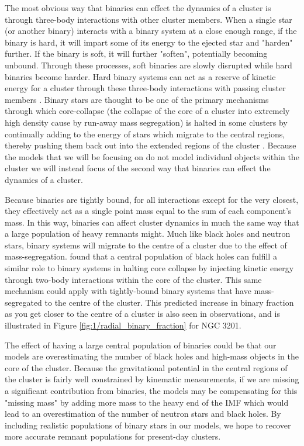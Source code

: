 The most obvious way that binaries can effect the dynamics of a cluster is through three-body
interactions with other cluster members. When a single star (or another binary) interacts with a
binary system at a close enough range, if the binary is hard, it will impart some of its energy to
the ejected star and "harden" further. If the binary is soft, it will further "soften", potentially
becoming unbound. Through these processes, soft binaries are slowly disrupted while hard binaries
become harder. Hard binary systems can act as a reserve of kinetic energy for a cluster through
these three-body interactions with passing cluster members \citep{Heggie2003}. Binary stars are
thought to be one of the primary mechanisms through which core-collapse (the collapse of the core of
a cluster into extremely high density cause by run-away mass segregation) is halted in some clusters
by continually adding to the energy of stars which migrate to the central regions, thereby pushing
them back out into the extended regions of the cluster \citep{Chatterjee2013}. Because the models
that we will be focusing on do not model individual objects within the cluster we will instead focus
of the second way that binaries can effect the dynamics of a cluster.

Because binaries are tightly bound, for all interactions except for the very closest, they
effectively act as a single point mass equal to the sum of each component's mass. In this way,
binaries can affect cluster dynamics in much the same way that a large population of heavy remnants
might. Much like black holes and neutron stars, binary systems will migrate to the centre of a
cluster due to the effect of mass-segregation. \citet{Kremer2019} found that a central population of
black holes can fulfill a similar role to binary systems in halting core collapse by injecting
kinetic energy through two-body interactions within the core of the cluster. This same mechanism
could apply with tightly-bound binary systems that have mass-segregated to the centre of the
cluster. This predicted increase in binary fraction as you get closer to the centre of a cluster is
also seen in observations, and is illustrated in Figure \ref{fig:1/radial_binary_fraction} for NGC
3201.

The effect of having a large central population of binaries could be that our models are
overestimating the number of black holes and high-mass objects in the core of the cluster. Because
the gravitational potential in the central regions of the cluster is fairly well constrained by
kinematic measurements, if we are missing a significant contribution from binaries, the models may
be compensating for this "missing mass" by adding more mass to the heavy end of the IMF which would
lead to an overestimation of the number of neutron stars and black holes. By including realistic
populations of binary stars in our models, we hope to recover more accurate remnant populations for
present-day clusters.




